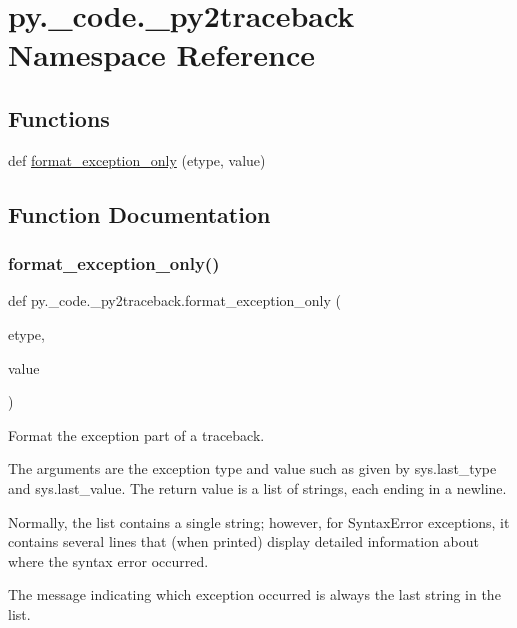 \hypertarget{namespacepy_1_1__code_1_1__py2traceback}{}\section{py.\+\_\+code.\+\_\+py2traceback Namespace Reference}
\label{namespacepy_1_1__code_1_1__py2traceback}
\subsection*{Functions}
\begin{DoxyCompactItemize}
\item 
def \hyperlink{namespacepy_1_1__code_1_1__py2traceback_a2fefaf56bcbf96feaa8c407ae129daec}{format\+\_\+exception\+\_\+only} (etype, value)
\end{DoxyCompactItemize}


\subsection{Function Documentation}
\mbox{\label{namespacepy_1_1__code_1_1__py2traceback_a2fefaf56bcbf96feaa8c407ae129daec}} 
\subsubsection{\texorpdfstring{format\+\_\+exception\+\_\+only()}{format\_exception\_only()}}
{\footnotesize\ttfamily def py.\+\_\+code.\+\_\+py2traceback.\+format\+\_\+exception\+\_\+only (\begin{DoxyParamCaption}\item[{}]{etype,  }\item[{}]{value }\end{DoxyParamCaption})}

\begin{DoxyVerb}Format the exception part of a traceback.

The arguments are the exception type and value such as given by
sys.last_type and sys.last_value. The return value is a list of
strings, each ending in a newline.

Normally, the list contains a single string; however, for
SyntaxError exceptions, it contains several lines that (when
printed) display detailed information about where the syntax
error occurred.

The message indicating which exception occurred is always the last
string in the list.\end{DoxyVerb}
 